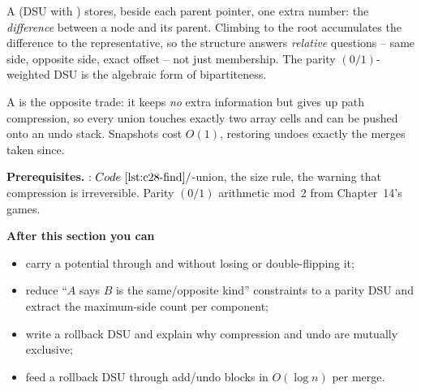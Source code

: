 \begin{topicintro}
A  (DSU with ) stores, beside each parent
pointer, one extra number: the \emph{difference} between a node and its
parent.  Climbing to the root accumulates the difference to the
representative, so the structure answers \emph{relative} questions -- same
side, opposite side, exact offset -- not just membership.  The parity
\((0/1)\)-weighted DSU is the algebraic form of bipartiteness.

A  is the opposite trade: it keeps \emph{no} extra
information but gives up path compression, so every union touches exactly two
array cells and can be pushed onto an undo stack.  Snapshots cost \(O(1)\),
restoring undoes exactly the merges taken since.

\textbf{Prerequisites.} : \(\coderef{c28-find}/\)-union, the
size rule, the warning that compression is irreversible.  Parity
\((0/1)\) arithmetic mod~2 from Chapter~14's games.

\textbf{After this section you can}
\begin{itemize}[nosep]
  \item carry a potential through  and  without losing
        or double-flipping it; \hfill{}
  \item reduce ``\(A\) says \(B\) is the same/opposite kind'' constraints to a
        parity DSU and extract the maximum-side count per component; \hfill{}
  \item write a rollback DSU and explain why compression and undo are
        mutually exclusive; \hfill{}
  \item feed a rollback DSU through add/undo blocks in \(O(\log n)\) per
        merge. \hfill{}
\end{itemize}
\end{topicintro}

